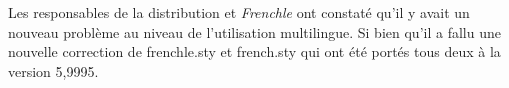 \documentclass[a4paper,12pt,openright]{article}
\begin{document}
Les responsables de la distribution \slefr{} et {\sl Frenchle} ont constaté qu'il y avait un nouveau
problème au niveau de l'utilisation multilingue. Si bien qu'il a 
fallu une nouvelle correction de frenchle.sty et french.sty qui ont été portés tous deux à la version 5,9995.

%
%
\end{document}
